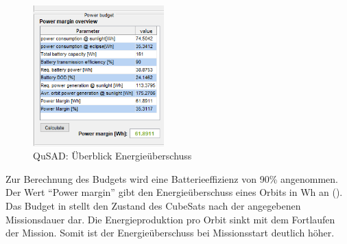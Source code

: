 			
			\begin{figure}[H]
				\centering
					\includegraphics[width=0.45\textwidth]{graphics/power6.png}
				\caption{QuSAD: Überblick Energieüberschuss}
				\label{fig:power6}
			\end{figure}
Zur Berechnung des Budgets wird eine Batterieeffizienz von \num{90}\% angenommen. Der Wert “Power margin” gibt den Energieüberschuss eines Orbits in Wh an (). Das Budget in  stellt den Zustand des CubeSats nach der angegebenen Missionsdauer dar. Die Energieproduktion pro Orbit sinkt mit dem Fortlaufen der  Mission. Somit ist der Energieüberschuss bei Missionsstart deutlich höher. 			
			
			
			
